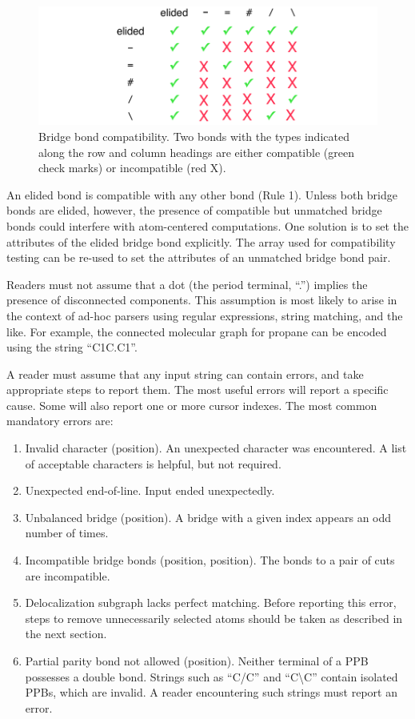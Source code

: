 \documentclass{article}
\begin{document}
\begin{figure}
    \centering
    \includegraphics[width=\columnwidth]{brdige-bond-compatibility.pdf}
    \caption{Bridge bond compatibility. Two bonds with the types indicated along the row and column headings are either compatible (green check marks) or incompatible (red X).}
    \label{fig:bridge-bond-compatibility}
\end{figure}

An elided bond is compatible with any other bond (Rule 1). Unless both bridge bonds are elided, however, the presence of compatible but unmatched bridge bonds could interfere with atom-centered computations. One solution is to set the attributes of the elided bridge bond explicitly. The array used for compatibility testing can be re-used to set the attributes of an unmatched bridge bond pair.

Readers must not assume that a dot (the period terminal, \enquote{.}) implies the presence of disconnected components. This assumption is most likely to arise in the context of ad-hoc parsers using regular expressions, string matching, and the like. For example, the connected molecular graph for propane can be encoded using the string \enquote{C1C.C1}.

A reader must assume that any input string can contain errors, and take appropriate steps to report them. The most useful errors will report a specific cause. Some will also report one or more cursor indexes. The most common mandatory errors are:

\begin{enumerate}
    \item{Invalid character (position). An unexpected character was encountered. A list of acceptable characters is helpful, but not required.}
    \item{Unexpected end-of-line. Input ended unexpectedly.}
    \item{Unbalanced bridge (position). A bridge with a given index appears an odd number of times.}
    \item{Incompatible bridge bonds (position, position). The bonds to a pair of cuts are incompatible.}
    \item{Delocalization subgraph lacks perfect matching. Before reporting this error, steps to remove unnecessarily selected atoms should be taken as described in the next section.}
    \item{Partial parity bond not allowed (position). Neither terminal of a PPB possesses a double bond. Strings such as \enquote{C/C} and \enquote{C{\textbackslash}C} contain isolated PPBs, which are invalid. A reader encountering such strings must report an error.}
\end{enumerate}
\end{document}

